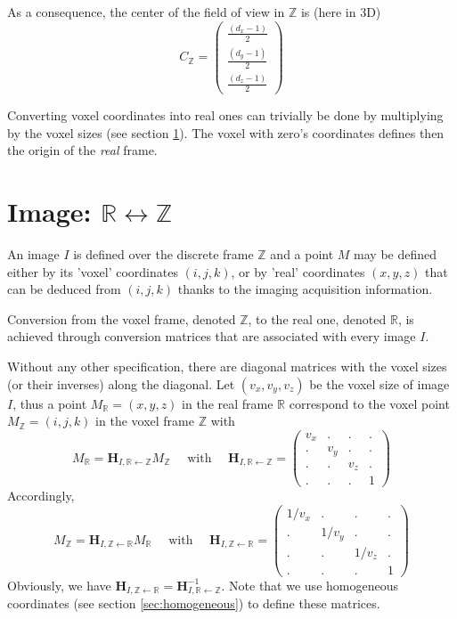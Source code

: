 As a consequence, the center of the field of view in $\mathbb{Z}$ is (here in 3D)
\begin{displaymath}
C_{\mathbb{Z}} = 
\left(
\begin{array}{c}
\frac{(d_{x}-1)}{2} \\
\frac{(d_{y}-1)}{2} \\
\frac{(d_{z}-1)}{2}
\end{array}
\right)
\end{displaymath}

Converting voxel coordinates into real ones can trivially be done by multiplying by the voxel sizes (see section \ref{sec:frame:conversion}). The voxel with zero's coordinates defines then the origin of the \textit{real} frame.

\section{Image: $\mathbb{R} \leftrightarrow \mathbb{Z}$}
\label{sec:frame:conversion}


An image $I$ is defined over the discrete frame $\mathbb{Z}$ and a point $M$ may be defined either by its 'voxel' coordinates $(i,j,k)$, or by 'real' coordinates $(x,y,z)$ that can be deduced from $(i,j,k)$ thanks to the imaging acquisition information.

Conversion from the voxel frame, denoted $\mathbb{Z}$, to the real one, denoted $\mathbb{R}$, is achieved through conversion matrices that are associated with every image $I$.

Without any other specification, there are diagonal matrices with the voxel sizes (or their inverses) along the diagonal. Let $(v_x, v_y, v_z)$ be the voxel size of image $I$, thus a point $M_{\mathbb{R}} = (x,y,z)$ in the real frame $\mathbb{R}$ correspond to the voxel point $M_{\mathbb{Z}} = (i,j,k)$ in the voxel frame $\mathbb{Z}$ with
$$M_{\mathbb{R}} = \mathbf{H}_{I,\mathbb{R} \leftarrow \mathbb{Z}} M_{\mathbb{Z}}
\quad \mbox{ with } \quad
\mathbf{H}_{I,\mathbb{R} \leftarrow \mathbb{Z}} = \left( \begin{array}{cccc}
v_x & . & . & . \\
. & v_y & . & . \\
. & . & v_z & . \\
. & . & . & 1  
\end{array} \right)
$$
Accordingly,
$$M_{\mathbb{Z}} = \mathbf{H}_{I,\mathbb{Z} \leftarrow \mathbb{R}} M_{\mathbb{R}}
\quad \mbox{ with } \quad
\mathbf{H}_{I,\mathbb{Z} \leftarrow \mathbb{R}} = \left( \begin{array}{cccc}
1/v_x & . & . & . \\
. & 1/v_y & . & . \\
. & . & 1/v_z & . \\
. & . & . & 1  
\end{array} \right)
$$
Obviously, we have $\mathbf{H}_{I,\mathbb{Z} \leftarrow \mathbb{R}} = \mathbf{H}^{-1}_{I,\mathbb{R} \leftarrow \mathbb{Z}}$. Note that we use homogeneous coordinates (see section \ref{sec:homogeneous}) to define these matrices.


